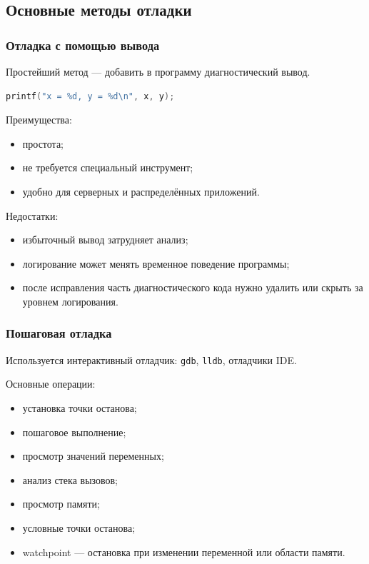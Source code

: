 \documentclass[12pt,a4paper]{article}
\begin{document}
\subsection{Основные методы отладки}

\subsubsection{Отладка с помощью вывода}

Простейший метод --- добавить в программу диагностический вывод.

\begin{lstlisting}[language=C]
printf("x = %d, y = %d\n", x, y);
\end{lstlisting}

Преимущества:
\begin{itemize}
    \item простота;
    \item не требуется специальный инструмент;
    \item удобно для серверных и распределённых приложений.
\end{itemize}

Недостатки:
\begin{itemize}
    \item избыточный вывод затрудняет анализ;
    \item логирование может менять временное поведение программы;
    \item после исправления часть диагностического кода нужно удалить или скрыть за уровнем логирования.
\end{itemize}

\subsubsection{Пошаговая отладка}

Используется интерактивный отладчик: \texttt{gdb}, \texttt{lldb}, отладчики IDE.

Основные операции:

\begin{itemize}
    \item установка точки останова;
    \item пошаговое выполнение;
    \item просмотр значений переменных;
    \item анализ стека вызовов;
    \item просмотр памяти;
    \item условные точки останова;
    \item watchpoint --- остановка при изменении переменной или области памяти.
\end{itemize}
\end{document}
